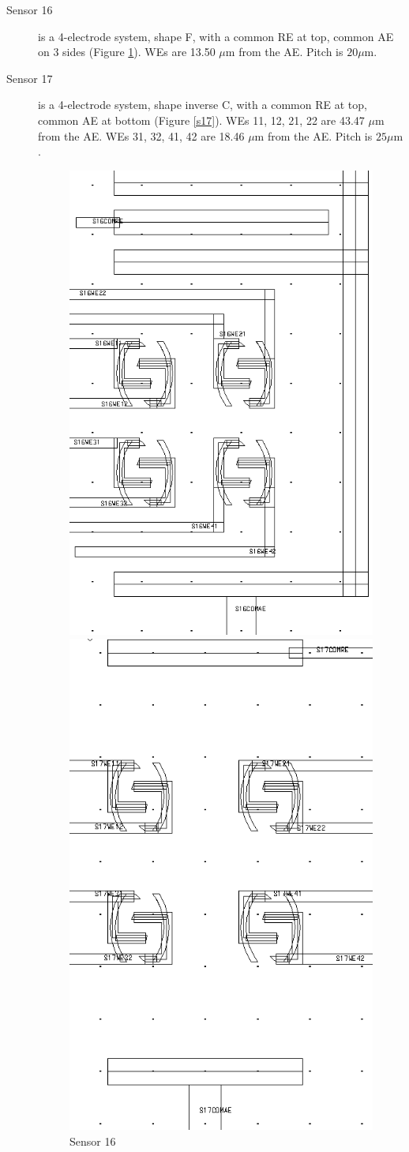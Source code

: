 \begin{description}
\item[Sensor 16] is a 4-electrode system, shape F, with a common RE at top, common AE on 3 sides (Figure \ref{s16}). WEs are 13.50 $\mu \mathrm{m}$ from the AE. Pitch is $20 \mu \mathrm{m}$.
\item[Sensor 17] is a 4-electrode system, shape inverse C, with a common RE at top, common AE at bottom (Figure \ref{s17}). WEs 11, 12, 21, 22 are 43.47 $\mu \mathrm{m}$ from the AE. WEs 31, 32, 41, 42 are 18.46 $\mu \mathrm{m}$ from the AE. Pitch is $25 \mu \mathrm{m}$.

\begin{figure}
	\begin{minipage}{0.5\linewidth}
		\centering
		\includegraphics[width=0.6\linewidth]{figures/s16.png}
		\caption{Sensor 16}
		\label{s16}
	\end{minipage}
	\begin{minipage}{0.5\linewidth}
		\centering
		\includegraphics[width=0.6\linewidth]{figures/s17.png}

\end{minipage}
\end{figure}
\end{description}
